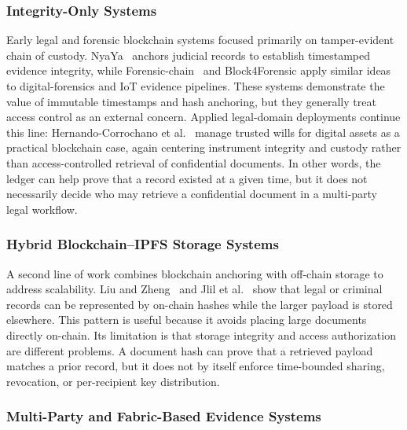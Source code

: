 \documentclass[preprint,12pt]{elsarticle}
\begin{document}
\subsubsection{Integrity-Only Systems}

Early legal and forensic blockchain systems focused primarily on
tamper-evident chain of custody. NyaYa~\cite{verma2021nyaya} anchors
judicial records to establish timestamped evidence integrity, while
Forensic-chain~\cite{lone2019forensic} and Block4Forensic
\cite{cebe2018block} apply similar ideas to digital-forensics and IoT
evidence pipelines. These systems demonstrate the value of immutable
timestamps and hash anchoring, but they generally treat access control
as an external concern. Applied legal-domain deployments continue this
line: Hernando-Corrochano et al.~\cite{hernando2025wills} manage
trusted wills for digital assets as a practical blockchain case, again
centering instrument integrity and custody rather than
access-controlled retrieval of confidential documents. In other words,
the ledger can help prove that
a record existed at a given time, but it does not necessarily decide
who may retrieve a confidential document in a multi-party legal
workflow.

\subsubsection{Hybrid Blockchain--IPFS Storage Systems}

A second line of work combines blockchain anchoring with off-chain
storage to address scalability. Liu and Zheng~\cite{liu2024blockchain}
and Jlil et al.~\cite{jlil2024blockchain} show that legal or criminal
records can be represented by on-chain hashes while the larger payload
is stored elsewhere. This pattern is useful because it avoids placing
large documents directly on-chain. Its limitation is that storage
integrity and access authorization are different problems. A document
hash can prove that a retrieved payload matches a prior record, but it
does not by itself enforce time-bounded sharing, revocation, or
per-recipient key distribution.

\subsubsection{Multi-Party and Fabric-Based Evidence Systems}
\end{document}
